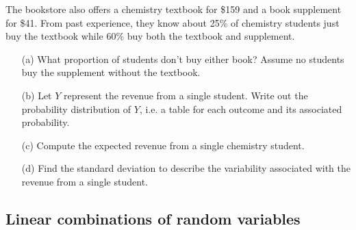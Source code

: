 \begin{exercisewrap}
\begin{nexercise}
The bookstore also offers a chemistry textbook for \$159 and a book supplement for \$41. From past experience, they know about 25\% of chemistry students just buy the textbook while 60\% buy both the textbook and supplement.\footnotemark
\begin{enumerate}
\item[(a)] What proportion of students don't buy either book? Assume no students buy the supplement without the textbook.
\item[(b)] Let $Y$ represent the revenue from a single student. Write out the probability distribution of $Y$, i.e. a table for each outcome and its associated probability.
\item[(c)] Compute the expected revenue from a single chemistry student. 
\item[(d)] Find the standard deviation to describe the variability associated with the revenue from a single student.
\end{enumerate}
\end{nexercise}
\end{exercisewrap}

\subsection{Linear combinations of random variables}

